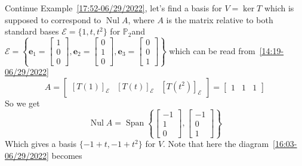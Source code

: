 \documentclass{beamer}
\DeclareMathOperator{\Nul}{Nul}
\theoremstyle{definition}
\theoremstyle{remark}
\DeclareMathOperator{\Span}{Span}
\begin{document}
\begin{frame}[t]
\begin{example}\label{10:24-07/01/2022}
Continue Example~\ref{17:52-06/29/2022}, let's find a basis for $V=\ker T$ which is supposed to correspond to $\Nul A$, where $A$ is the matrix relative to both standard bases $\mathcal E=\{1,t,t^2\}$ for $\mathbb P_2$\pause and $\mathcal E=\left\{\mathbf e_1=\begin{bmatrix}
1\\0\\0
\end{bmatrix},\mathbf e_2=\begin{bmatrix}
0\\1\\0
\end{bmatrix},\mathbf e_3=\begin{bmatrix}
0\\0\\1
\end{bmatrix}\right\}$ which can be read from~\eqref{14:19-06/29/2022}
\[
A=\begin{bmatrix}
[T(1)]_{\mathcal E}&[T(t)]_{\mathcal E}&[T(t^2)]_{\mathcal E}
\end{bmatrix}=\begin{bmatrix}
1&1&1
\end{bmatrix}
\]\pause
So we get
\[
\Nul A=\Span\left\{\begin{bmatrix}
-1\\1\\0
\end{bmatrix},\begin{bmatrix}
-1\\0\\1
\end{bmatrix}\right\}
\]\pause
Which gives a basis $\{-1+t,-1+t^2\}$ for $V$. Note that here the diagram~\eqref{16:03-06/29/2022} becomes
\end{example}
\end{frame}

\begin{frame}[t]
\begin{example}
\begin{center}
\end{center}
\end{example}
\end{frame}
\end{document}
